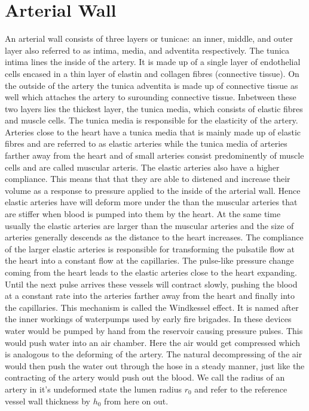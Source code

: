 \documentclass[a4paper, oneside]{discothesis}
\begin{document}
\section{Arterial Wall} \label{aw}
An arterial wall consists of three layers or tunicae: an inner, middle, and outer layer also referred to as intima, media, and adventita respectively.
The tunica intima lines the inside of the artery. It is made up of a single layer of endothelial cells encased in a thin layer of elastin and collagen fibres (connective tissue). 
On the outside of the artery the tunica adventita is made up of connective tissue as well which attaches the artery to surounding connective tissue.
Inbetween these two layers lies the thickest layer, the tunica media, which consists of elastic fibres and muscle cells. 
The tunica media is responsible for the elasticity of the artery.
Arteries close to the heart have a tunica media that is mainly made up of elastic fibres and are referred to as elastic arteries while the tunica media of arteries farther away from the heart and of small arteries consist predominently of muscle cells and are called muscular arteris.
The elastic arteries also have a higher compliance.
This means that that they are able to distened and increase their volume as a response to pressure applied to the inside of the arterial wall.
Hence elastic arteries have will deform more under the than the muscular arteries that are stiffer when blood is pumped into them by the heart.
At the same time usually the elastic arteries are larger than the muscular arteries and the size of arteries generally descends as the distance to the heart increases.
The compliance of the larger elastic arteries is responsible for transforming the pulsatile flow at the heart into a constant flow at the capillaries.
The pulse-like pressure change coming from the heart leads to the elastic arteries close to the heart expanding.
Until the next pulse arrives these vessels will contract slowly, pushing the blood at a constant rate into the arteries farther away from the heart and finally into the capillaries.
This mechanism is called the Windkessel effect.
It is named after the inner workings of waterpumps used by early fire brigades.
In these devices water would be pumped by hand from the reservoir causing pressure pulses.
This would push water into an air chamber.
Here the air would get compressed which is analogous to the deforming of the artery.
The natural decompressing of the air would then push the water out through the hose in a steady manner, just like the contracting of the artery would push out the blood.
We call the radius of an artery in it's undeformed state the lumen radius $r_0$ and refer to the reference vessel wall thickness by $h_0$ from here on out.
\end{document}
